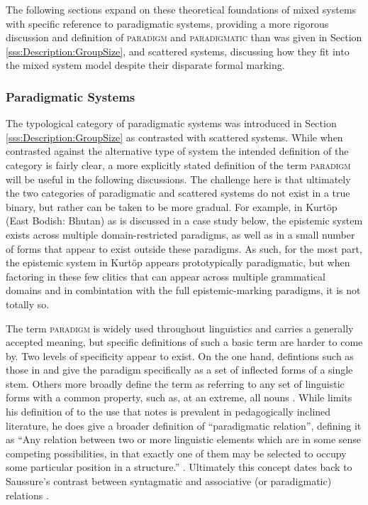 The following sections expand on these theoretical foundations of mixed systems with specific reference to paradigmatic systems, providing a more rigorous discussion and definition of \textsc{paradigm} and \textsc{paradigmatic} than was given in Section \ref{sss:Description:GroupSize}, and scattered systems, discussing how they fit into the mixed system model despite their disparate formal marking.

\subsubsection{Paradigmatic Systems}\label{sss:Discussion:Paradigmatic}
The typological category of paradigmatic systems was introduced in Section \ref{sss:Description:GroupSize} as contrasted with scattered systems. While when contrasted against the alternative type of system the intended definition of the category is fairly clear, a more explicitly stated definition of the term \textsc{paradigm} will be useful in the following discussions. The challenge here is that ultimately the two categories of paradigmatic and scattered systems do not exist in a true binary, but rather can be taken to be more gradual. For example, in Kurtöp (East Bodish: Bhutan) as is discussed in a case study below, the epistemic system exists across multiple domain-restricted paradigms, as well as in a small number of forms that appear to exist outside these paradigms. As such, for the most part, the epistemic system in Kurtöp appears prototypically paradigmatic, but when factoring in these few clitics that can appear across multiple grammatical domains and in combintation with the full epistemic-marking paradigms, it is not totally so.

The term \textsc{paradigm} is widely used throughout linguistics and carries a generally accepted meaning, but specific definitions of such a basic term are harder to come by. Two levels of specificity appear to exist. On the one hand, defintions such as those in  and  give the paradigm specifically as a set of inflected forms of a single stem. Others more broadly define the term as referring to any set of linguistic forms with a common property, such as, at an extreme, all nouns \cite{Booij2007}. While  limits his definition of to the use that  notes is prevalent in pedagogically inclined literature, he does give a broader definition of ``paradigmatic relation'', defining it as ``Any relation between two or more linguistic elements which are in some sense competing possibilities, in that exactly one of them may be selected to occupy some particular position in a structure.'' \cite[197]{Trask1993}. Ultimately this concept dates back to Saussure's contrast between syntagmatic and associative (or paradigmatic) relations \cite{Saussure2013}.

